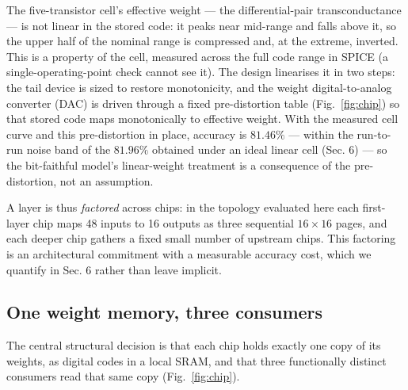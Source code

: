 \documentclass[11pt]{article}
\begin{document}
The five-transistor cell's effective weight --- the differential-pair
transconductance --- is not linear in the stored code: it peaks near
mid-range and falls above it, so the upper half of the nominal range is
compressed and, at the extreme, inverted. This is a property of the
cell, measured across the full code range in SPICE (a
single-operating-point check cannot see it). The design linearises it in
two steps: the tail device is sized to restore monotonicity, and the
weight digital-to-analog converter (DAC) is driven through a fixed
pre-distortion table (Fig.~\ref{fig:chip}) so that stored code maps monotonically to
effective weight. With the measured cell curve and this pre-distortion
in place, accuracy is \(81.46\%\) --- within the run-to-run noise band
of the \(81.96\%\) obtained under an ideal linear cell (Sec. 6) --- so
the bit-faithful model's linear-weight treatment is a consequence of the
pre-distortion, not an assumption.

A layer is thus \emph{factored} across chips: in the topology evaluated
here each first-layer chip maps 48 inputs to 16 outputs as three
sequential \(16\times16\) pages, and each deeper chip gathers a fixed
small number of upstream chips. This factoring is an architectural
commitment with a measurable accuracy cost, which we quantify in Sec. 6
rather than leave implicit.

\hypertarget{sec:three}{%
\subsection{One weight memory, three consumers}\label{sec:three}}

The central structural decision is that each chip holds exactly one copy
of its weights, as digital codes in a local SRAM, and that three
functionally distinct consumers read that same copy (Fig.~\ref{fig:chip}).
\end{document}
